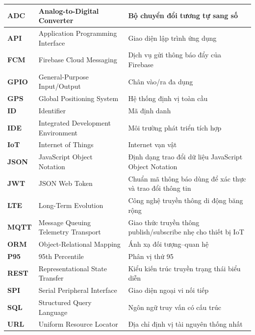 \documentclass[../DoAn.tex]{subfiles}
\begin{document}
\begin{longtable}{|>{\raggedright\arraybackslash}p{2.2cm}|>{\raggedright\arraybackslash}p{5.2cm}|>{\raggedright\arraybackslash}p{6cm}|}
    \textbf{ADC} & Analog-to-Digital Converter & Bộ chuyển đổi tương tự sang số \\
    \hline
    \textbf{API} & Application Programming Interface & Giao diện lập trình ứng dụng \\
    \hline
    \textbf{FCM} & Firebase Cloud Messaging & Dịch vụ gửi thông báo đẩy của Firebase \\
    \hline
    \textbf{GPIO} & General-Purpose Input/Output & Chân vào/ra đa dụng \\
    \hline
    \textbf{GPS} & Global Positioning System & Hệ thống định vị toàn cầu \\
    \hline
    \textbf{ID} & Identifier & Mã định danh \\
    \hline
    \textbf{IDE} & Integrated Development Environment & Môi trường phát triển tích hợp \\
    \hline
    \textbf{IoT} & Internet of Things & Internet vạn vật \\
    \hline
    \textbf{JSON} & JavaScript Object Notation & Định dạng trao đổi dữ liệu JavaScript Object Notation \\
    \hline
    \textbf{JWT} & JSON Web Token & Chuẩn mã thông báo dùng để xác thực và trao đổi thông tin \\
    \hline
    \textbf{LTE} & Long-Term Evolution & Công nghệ truyền thông di động băng rộng \\
    \hline
    \textbf{MQTT} & Message Queuing Telemetry Transport & Giao thức truyền thông publish/subscribe nhẹ cho thiết bị IoT \\
    \hline
    \textbf{ORM} & Object-Relational Mapping & Ánh xạ đối tượng--quan hệ \\
    \hline
    \textbf{P95} & 95th Percentile & Phân vị thứ 95 \\
    \hline
    \textbf{REST} & Representational State Transfer & Kiểu kiến trúc truyền trạng thái biểu diễn \\
    \hline
    \textbf{SPI} & Serial Peripheral Interface & Giao diện ngoại vi nối tiếp \\
    \hline
    \textbf{SQL} & Structured Query Language & Ngôn ngữ truy vấn có cấu trúc \\
    \hline
    \textbf{URL} & Uniform Resource Locator & Địa chỉ định vị tài nguyên thống nhất \\
    \hline
\end{longtable}

\normalsize
\end{document}

